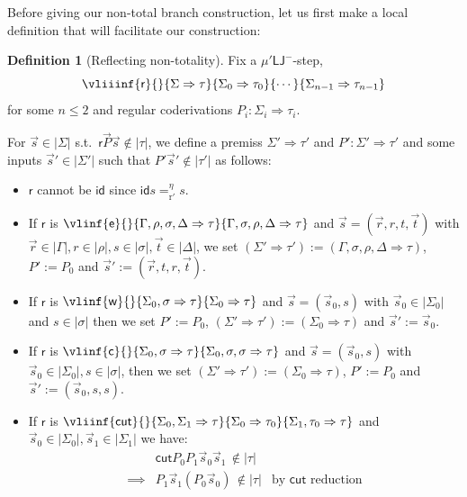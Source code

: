 \documentclass[10pt,a4paper]{amsart}
\theoremstyle{plain}
\theoremstyle{definition}
\newtheorem{definition}[definition]{Definition}
\theoremstyle{plain}
\theoremstyle{definition} %
\newcommand{\seqar}{\Rightarrow}
\newcommand{\infrule}{\mathsf{r}}
\newcommand{\rrule}{\infrule} %
\newcommand{\id}{\mathsf{id}}
\newcommand{\ex}{\mathsf{e}}
\newcommand{\cut}{\mathsf{cut}}
\newcommand{\wk}{\mathsf{w}}
\newcommand{\contr}{\mathsf{c}}
\newcommand{\LJ}{\mathsf{LJ}}
\newcommand{\muLJnorec}{\mu'\LJ}
\newcommand{\muLJnegnorec}{\muLJnorec^-}
\newcommand{\reductionnorec}{\mathrm{r}'}
\newcommand{\convertsnoreceta}{=_{\reductionnorec}^\eta} %
\newcommand{\der}{P}
\newcommand{\hr}[1]{|#1|}
\begin{document}
Before giving our non-total branch construction, let us first make a local definition that will facilitate our construction:
\begin{definition}
    [Reflecting non-totality]
    \label{def:refl-non-totality}
    Fix a $\muLJnegnorec$-step,
    \[
    \vliiinf{ \rrule}{}{\Sigma \seqar \tau}{\Sigma_0 \seqar \tau_0}{\cdots}{\Sigma_{n-1} \seqar \tau_{n-1}}
    \] 
    for some $n\leq 2$ and regular coderivations $\der_i:\Sigma_i\seqar \tau_i$. 
    
    For $\vec s \in \hr{\Sigma}$ s.t.\ $ \rrule {\vec \der} \vec s \notin \hr \tau$,
    we define a premiss $\Sigma' \seqar \tau'$ and $\der':\Sigma'\seqar \tau'$ and some inputs $\vec s' \in \hr{ \Sigma'}$ such that $\der'\vec s'
    \notin \hr{\tau'}$
    as follows:
\begin{itemize} 
\item $\rrule $ cannot be $\id$ since $\id s \convertsnoreceta s$.
\item If $\rrule $ is $\vlinf{\ex}{}{\Gamma, \rho, \sigma, \Delta \seqar \tau}{\Gamma , \sigma, \rho , \Delta \seqar \tau}$ and $\vec s = (\vec r, r , t,\vec t)$ with $\vec r \in \hr \Gamma, r\in \hr \rho , s \in \hr \sigma, \vec t \in \hr \Delta$, we set $(\Sigma'\seqar \tau'):= (\Gamma, \sigma, \rho, \Delta \seqar \tau)$, $\der':=\der_0$ and $\vec s':= (\vec r,t,r,\vec t)$.
\item If $\rrule $ is $\vlinf{\wk}{}{\Sigma_0,\sigma \seqar \tau}{\Sigma_0 \seqar \tau}$ and $\vec s = (\vec s_0,s) $ with $\vec s_0 \in \hr{\Sigma_0}$ and $s \in \hr \sigma$ then we set $\der':= \der_0$, $(\Sigma'\seqar \tau'):= (\Sigma_0 \seqar \tau)$ and $\vec s' := \vec s_0$. 
\item If $\rrule $ is $\vlinf{\contr}{}{\Sigma_0 , \sigma\seqar \tau}{\Sigma_0, \sigma, \sigma \seqar \tau}$ and $\vec s = (\vec s_0,s)$ with $\vec s_0 \in \hr {\Sigma_0}, s\in \hr \sigma$, then we set $(\Sigma' \seqar \tau'):= \allowbreak (\Sigma_0\seqar \tau)$, $\der':= \der_0$ and $\vec s' := (\vec s_0,s,s)$.
\item If $\rrule $ is 
\(
\vliinf{\cut}{}{\Sigma_0,\Sigma_1 \seqar \tau}{\Sigma_0 \seqar \tau_0}{\Sigma_1, \tau_0 \seqar \tau }
\)
and $\vec s_0 \in \hr{\Sigma_0}, \vec s_1 \in \hr{\Sigma_1}$ we have:
\[
\begin{array}{rll}
     & \cut \der_0 \der_1 \vec s_0 \vec s_1\, \notin \hr\tau \\
     \implies & \der_1  \vec s_1 (\der_0 \vec s_0) \, \notin \hr \tau & \text{by $\cut$ reduction}
\end{array}
\]
\end{itemize}
\end{definition}
\end{document}
